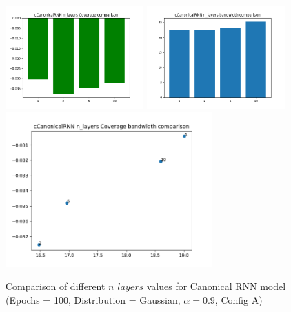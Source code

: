 \documentclass[a4paper, 12pt]{article}
\begin{document}
\begin{figure}[!h]
    \centering
    \includegraphics[width=200px]{plots/hist/a/cCanonicalRNN/n_layers/Coverage.png}
    \includegraphics[width=200px]{plots/hist/a/cCanonicalRNN/n_layers/bandwidth.png}
    \includegraphics[width=300px]{plots/scatter/a/cCanonicalRNN/n_layers/Coverage_bandwidth.png}
    \caption{Comparison of different $n\_layers$ values for Canonical RNN model (Epochs = 100, Distribution = Gaussian, $\alpha = 0.9$, Config A)}
    \label{fig:comp_canonicalrnn}
\end{figure}
\end{document}
